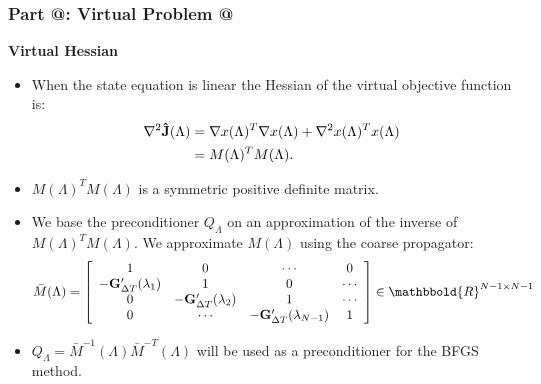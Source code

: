 \documentclass[9pt]{beamer}
\makeatletter
\newcommand*{\rom}[1]{\expandafter\@slowromancap\romannumeral #1@}
\makeatother
\begin{document}
\begin{frame}
\frametitle{\textbf{ Part \rom{4}:} Virtual Problem \rom{2}}
\textbf{Virtual Hessian}
\begin{itemize}
\item{When the state equation is linear the Hessian of the virtual objective function is:
{\small 
\begin{align*}
\nabla^2 \bold{\hat J}(\Lambda)&= \nabla x(\Lambda)^T \nabla x(\Lambda) + \nabla^2 x(\Lambda)^Tx(\Lambda) \\
&= M(\Lambda)^TM(\Lambda).
\end{align*}}}
\item<2->{$M(\Lambda)^TM(\Lambda)$ is a symmetric positive definite matrix.}
\end{itemize}
\begin{itemize}
\item<3->{We base the preconditioner $Q_{\Lambda}$ on an approximation of the inverse of {$M(\Lambda)^TM(\Lambda)$}. We approximate $M(\Lambda)$ using the coarse propagator:
\begin{align*}
\bar M(\Lambda)= \left[ \begin{array}{cccc}
   1 & 0 & \cdots & 0 \\  
   -\bold{G}_{\Delta T}'(\lambda_{1}) & 1 & 0 & \cdots \\ 
   0 &-\bold{G}_{\Delta T}'(\lambda_{2}) & 1  & \cdots \\
   0 &\cdots &-\bold{G}_{\Delta T}'(\lambda_{N-1}) & 1  \\
   \end{array}  \right]\in\mathbbold{R}^{N-1\times N-1}
\end{align*}}
\item<4->{$Q_{\Lambda}=\bar{M}^{-1}(\Lambda)\bar{M}^{-T}(\Lambda)$ will be used as a preconditioner for the BFGS method.}
\end{itemize}
\end{frame}
\end{document}
